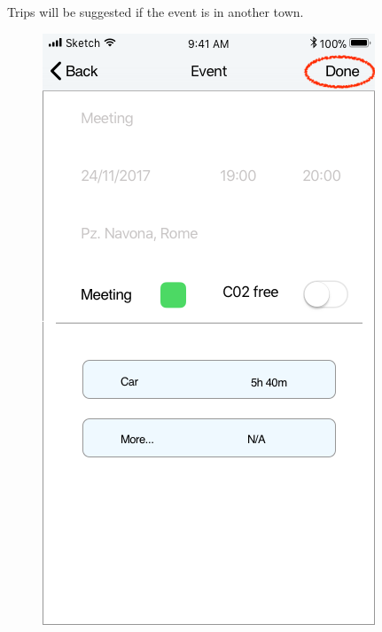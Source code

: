 Trips will be suggested if the event is in another town.
\begin{figure}[H]
	\centering
	\includegraphics[scale=0.23]{Images/Interface/Trips/1_event_in_rome}
	\hspace{0.5cm}

\end{figure}

